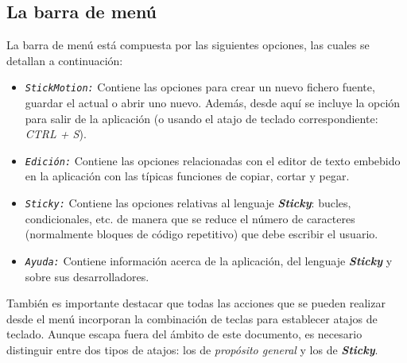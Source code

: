 \documentclass[a4paper,12pt]{article}
\begin{document}
    \subsection{La barra de menú}
    La barra de menú está compuesta por las siguientes opciones, las cuales se detallan a continuación:
    \begin{itemize}
      \item \texttt{\textit{StickMotion:}} Contiene las opciones para crear un nuevo fichero fuente, guardar el actual o abrir uno nuevo. Además, 
            desde aquí se incluye la opción para salir de la aplicación (o usando el atajo de teclado correspondiente: \textit{CTRL + S}).
      \item \texttt{\textit{Edición:}} Contiene las opciones relacionadas con el editor de texto embebido en la aplicación con las típicas funciones
            de copiar, cortar y pegar.
      \item \texttt{\textit{Sticky:}} Contiene las opciones relativas al lenguaje \textbf{\textit{Sticky}}: bucles, condicionales, etc. de manera
            que se reduce el número de caracteres (normalmente bloques de código repetitivo) que debe escribir el usuario.
      \item \texttt{\textit{Ayuda:}} Contiene información acerca de la aplicación, del lenguaje \textbf{\textit{Sticky}} y sobre sus 
            desarrolladores.\\ 
    \end{itemize}
    También es importante destacar que todas las acciones que se pueden realizar desde el menú incorporan la combinación de teclas para establecer
    atajos de teclado. Aunque escapa fuera del ámbito de este documento, es necesario distinguir entre dos tipos de atajos: los de \textit{propósito
    general} y los de \textbf{\textit{Sticky}}.
\end{document}
